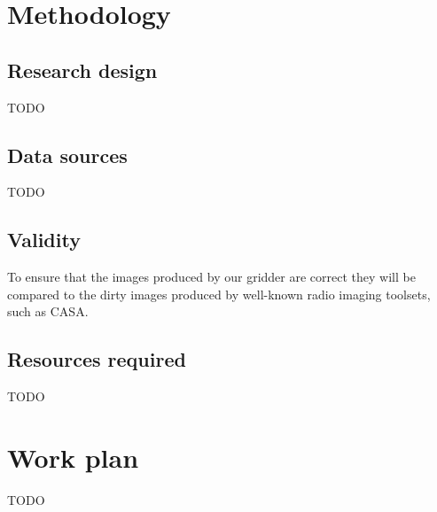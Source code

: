 \documentclass[a4paper, two column]{article}
\begin{document}
\section{Methodology}
\subsection{Research design}
{\color{red}TODO}
\subsection{Data sources}
{\color{red}TODO}
\subsection{Validity}
 To ensure that the images produced by our gridder are correct they will be compared to the dirty images produced by well-known radio imaging toolsets, such as CASA. 
\subsection{Resources required} 
{\color{red}TODO}
\section{Work plan}
{\color{red}TODO}


\end{document}
